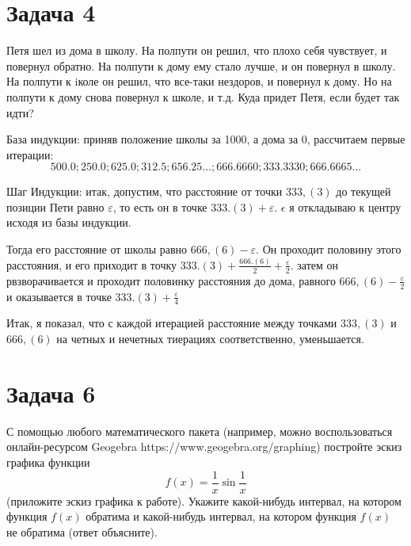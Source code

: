 \documentclass[11pt]{article}
\begin{document}
\section{Задача 4} 
Петя шел из дома в школу. На полпути он решил, что плохо себя чувствует, и
повернул обратно. На полпути к дому ему стало лучше, и он повернул в школу. На полпути к iколе он решил, что все-таки нездоров, и повернул к дому. Но на полпути к дому снова повернул
к школе, и т.д. Куда придет Петя, если будет так идти?

База индукции: приняв положение школы за 1000, а дома за 0, рассчитаем первые итерации:
$$500.0
;250.0
;625.0
;312.5
;656.25
\ldots
;666.6660
;333.3330
;666.6665
\ldots
$$

Шаг Индукции: итак, допустим, что расстояние от точки $333,(3)$ до текущей позиции Пети равно $\varepsilon$, то есть он в точке $333.(3)+\varepsilon$. $\epsilon$ я откладываю к центру исходя из базы индукции.

Тогда его расстояние от школы равно $666,(6)-\varepsilon$. Он проходит половину этого расстояния, и его приходит в точку $333.(3) + \frac{666.(6)}{2} + \frac{\varepsilon }{2}$. затем он рвзворачивается и проходит половинку расстояния до дома, равного $666,(6)-\frac{\varepsilon}{2}$ и оказывается в точке $333.(3)+\frac{\varepsilon}{4}$

Итак, я показал, что с каждой итерацией расстояние между точками $333,(3)$ и $666,(6)$ на четных и нечетных тиерациях соответственно, уменьшается.

\section{Задача 6}

С помощью любого математического пакета (например, можно воспользоваться онлайн-ресурсом Geogebra https://www.geogebra.org/graphing) постройте эскиз графика функции $$f(x) = \frac 1x \sin \frac 1x$$
(приложите эскиз графика к работе). Укажите какой-нибудь интервал, на котором функция $f(x)$ обратима и какой-нибудь интервал, на котором функция $f(x)$ не обратима
(ответ объясните).


\end{document}
